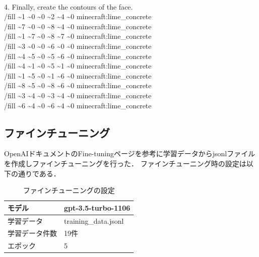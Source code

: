 {{    \\
    4. Finally, create the contours of the face.\\
    /fill \textasciitilde1 \textasciitilde0 \textasciitilde0 \textasciitilde2 \textasciitilde4 \textasciitilde0 minecraft:lime\_concrete\\
    /fill \textasciitilde7 \textasciitilde0 \textasciitilde0 \textasciitilde8 \textasciitilde4 \textasciitilde0 minecraft:lime\_concrete\\
    /fill \textasciitilde1 \textasciitilde7 \textasciitilde0 \textasciitilde8 \textasciitilde7 \textasciitilde0 minecraft:lime\_concrete\\
    /fill \textasciitilde3 \textasciitilde0 \textasciitilde0 \textasciitilde6 \textasciitilde0 \textasciitilde0 minecraft:lime\_concrete\\
    /fill \textasciitilde4 \textasciitilde5 \textasciitilde0 \textasciitilde5 \textasciitilde6 \textasciitilde0 minecraft:lime\_concrete\\
    /fill \textasciitilde4 \textasciitilde1 \textasciitilde0 \textasciitilde5 \textasciitilde1 \textasciitilde0 minecraft:lime\_concrete\\
    /fill \textasciitilde1 \textasciitilde5 \textasciitilde0 \textasciitilde1 \textasciitilde6 \textasciitilde0 minecraft:lime\_concrete\\
    /fill \textasciitilde8 \textasciitilde5 \textasciitilde0 \textasciitilde8 \textasciitilde6 \textasciitilde0 minecraft:lime\_concrete\\
    /fill \textasciitilde3 \textasciitilde4 \textasciitilde0 \textasciitilde3 \textasciitilde4 \textasciitilde0 minecraft:lime\_concrete\\
    /fill \textasciitilde6 \textasciitilde4 \textasciitilde0 \textasciitilde6 \textasciitilde4 \textasciitilde0 minecraft:lime\_concrete\\
    }
}
\newpage

\subsection{ファインチューニング}
OpenAIドキュメントのFine-tuningページ\cite{bib:fine-tuning}を参考に学習データからjsonlファイルを作成しファインチューニングを行った．
ファインチューニング時の設定は以下の通りである．

\begin{table}[H]
    \caption{ファインチューニングの設定}\label{tab:finetuning}
    \centering
    \begin{tabular}{ll}
        \hline \hline
        モデル & gpt-3.5-turbo-1106 \\
        \hline
        学習データ & training\_data.jsonl \\
        \hline
        学習データ件数 & 19件 \\
        \hline
        エポック & 5 \\
        \hline
    \end{tabular}
\end{table}